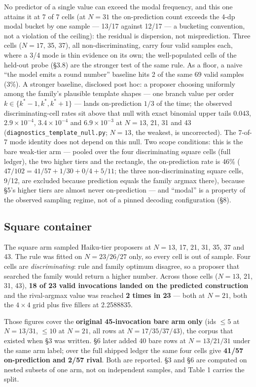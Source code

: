 No predictor of a single value can exceed the modal frequency, and this one attains it at 7 of
7 cells (at $N = 31$ the on-prediction count exceeds the 4-dp modal bucket by one sample ---
13/17 against 12/17 --- a bucketing convention, not a violation of the ceiling): the residual is
dispersion, not misprediction. Three cells ($N = 17$, 35, 37), all non-discriminating, carry four valid samples each, where a 3/4 mode is thin evidence on its own; the well-populated cells of the held-out probe (\S3.8) are the stronger test of the same rule. As a floor, a naive ``the model emits a
round number'' baseline hits 2 of the same 69 valid samples (3\%). A stronger baseline, disclosed
post hoc: a proposer choosing uniformly among the family's plausible template shapes --- one
branch value per order $k \in \{k^*{-}1, k^*, k^*{+}1\}$ --- lands on-prediction $1/3$ of the
time; the observed discriminating-cell rates sit above that null with exact binomial upper tails
$0.043$, $2.9\times10^{-4}$, $3.4\times10^{-4}$ and $6.9\times10^{-3}$ at $N = 13$, 21, 31 and 43
(\texttt{diagnostics\_template\_null.py}; $N = 13$, the weakest, is uncorrected). The 7-of-7 mode
identity does not depend on this null. Two scope conditions: this is
the bare weak-tier arm --- pooled over the four discriminating square cells (full ledger), the
two higher tiers and the rectangle, the on-prediction rate is 46\%
($47/102 = 41/57 + 1/30 + 0/4 + 5/11$; the three non-discriminating square cells, 9/12, are
excluded because prediction equals the family argmax there), because \S5's higher tiers are
almost never on-prediction --- and ``modal'' is a property
of the observed sampling regime, not of a pinned decoding configuration (\S8).

\subsection{Square container}

The square arm sampled Haiku-tier proposers at $N = 13$, 17, 21, 31, 35, 37 and 43. The rule was
fitted on $N = 23/26/27$ only, so every cell is out of sample. Four cells are \emph{discriminating}:
rule and family optimum disagree, so a proposer that searched the family would return a higher
number. Across those cells ($N = 13$, 21, 31, 43), \textbf{18 of 23 valid invocations landed on the
predicted construction} and the rival-argmax value was reached \textbf{2 times in 23} --- both at
$N = 21$, both the $4 \times 4$ grid plus five fillers at 2.2588835.

Those figures cover the \textbf{original 45-invocation bare arm only} (ids $\le 5$ at $N = 13/31$, $\le 10$ at
$N = 21$, all rows at $N = 17/35/37/43$), the corpus that existed when \S3 was written. \S6 later
added 40 bare rows at $N = 13/21/31$ under the same arm label; over the full shipped ledger the
same four cells give \textbf{41/57 on-prediction and 2/57 rival}. Both are reported. \S3 and \S6 are
computed on nested subsets of one arm, not on independent samples, and
Table 1 carries the split.

